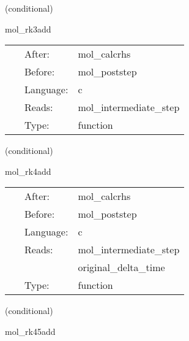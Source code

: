 \vspace{5mm}

   (conditional) 

\hspace{5mm} mol\_rk3add 

\hspace{5mm}{\it updates calculated with the efficient runge-kutta 3 method } 


\hspace{5mm}

 \begin{tabular*}{160mm}{cll} 
~ & After:  & mol\_calcrhs \\ 
~ & Before:  & mol\_poststep \\ 
~ & Language:  & c \\ 
~ & Reads:  & mol\_intermediate\_step \\ 
~ & Type:  & function \\ 
\end{tabular*} 


\vspace{5mm}

   (conditional) 

\hspace{5mm} mol\_rk4add 

\hspace{5mm}{\it updates calculated with the efficient runge-kutta 4 method } 


\hspace{5mm}

 \begin{tabular*}{160mm}{cll} 
~ & After:  & mol\_calcrhs \\ 
~ & Before:  & mol\_poststep \\ 
~ & Language:  & c \\ 
~ & Reads:  & mol\_intermediate\_step \\ 
~& ~ &original\_delta\_time\\ 
~ & Type:  & function \\ 
\end{tabular*} 


\vspace{5mm}

   (conditional) 

\hspace{5mm} mol\_rk45add 

\hspace{5mm}{\it updates calculated with the runge-kutta 45 method } 


